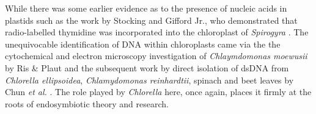 







While there was some earlier evidence as to the presence of nucleic acids in 
plastids such as the work by Stocking and Gifford Jr., who demonstrated that
radio-labelled thymidine was incorporated into the chloroplast of \textit{Spirogyra}
\citep{Stocking1959}.
The unequivocable identification of DNA within chloroplasts came via the 
the cytochemical and electron microscopy investigation of \textit{Chlaymdomonas moewusii} 
by Ris \& Plaut \citep{Ris1962} and the subsequent work by direct isolation of
dsDNA from \textit{Chlorella ellipsoidea}, \textit{Chlamydomonas reinhardtii}, spinach
and beet leaves by Chun \textit{et al.} \citep{Chun1963}. The role played by
\textit{Chlorella} here, once again, places it firmly at the roots of endosymbiotic
theory and research.



